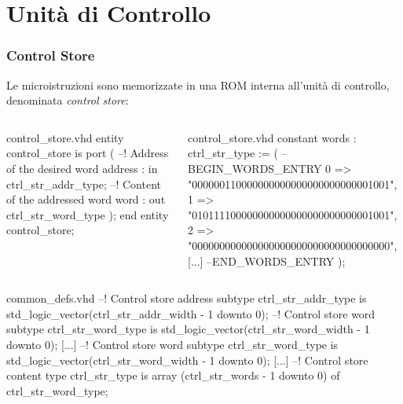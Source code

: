 \documentclass{beamer}
\begin{document}
\section{Unità di Controllo}
\begin{frame}[fragile]
  \frametitle{Control Store}
  Le microistruzioni sono memorizzate in una ROM interna all'unità di controllo,
  denominata \textit{control store}:
  \begin{columns}
    \begin{column}{0.5\textwidth}
\begin{myvhdl}{control\_store.vhd}
entity control_store is
  port (
    --! Address of the desired word
    address : in  ctrl_str_addr_type;
    --! Content of the addressed word
    word    : out ctrl_str_word_type
    );
end entity control_store;
\end{myvhdl}
\end{column}
\begin{column}{0.5\textwidth}
\begin{myvhdl}{control\_store.vhd}
constant words : ctrl_str_type := (
--BEGIN_WORDS_ENTRY
0 => "000000110000000000000000000000001001",
1 => "010111100000000000000000000000001001",
2 => "000000000000000000000000000000000000",
[...]
--END_WORDS_ENTRY
);
\end{myvhdl}
\end{column}
\end{columns}
\begin{myvhdl}{common\_defs.vhd}
--! Control store address
subtype ctrl_str_addr_type is std_logic_vector(ctrl_str_addr_width - 1 downto 0);
--! Control store word
subtype ctrl_str_word_type is std_logic_vector(ctrl_str_word_width - 1 downto 0);
[...]
--! Control store word
subtype ctrl_str_word_type is std_logic_vector(ctrl_str_word_width - 1 downto 0);
[...]
--! Control store content
type ctrl_str_type is array (ctrl_str_words - 1 downto 0) of ctrl_str_word_type;
\end{myvhdl}
\end{frame}
\end{document}
